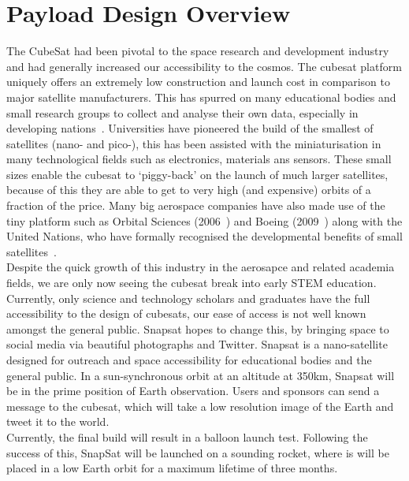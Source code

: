 \section{Payload Design Overview}
The CubeSat had been pivotal to the space research and development industry and had generally increased our accessibility to the cosmos. The cubesat platform uniquely offers an extremely low construction and launch cost in comparison to major satellite manufacturers. This has spurred on many educational bodies and small research groups to collect and analyse their own data, especially in developing nations~\cite{woeller}. Universities have pioneered the build of the smallest of satellites (nano- and pico-), this has been assisted with the miniaturisation in many technological fields such as electronics, materials ans sensors. These small sizes enable the cubesat to `piggy-back' on the launch of much larger satellites, because of this they are able to get to very high (and expensive) orbits of a fraction of the price. Many big aerospace companies have also made use of the tiny platform such as Orbital Sciences (2006~\cite{heidt}) and Boeing (2009~\cite{straub}) along with the United Nations, who have formally recognised the developmental benefits of small satellites~\cite{rycroft}. \\

\noindent
Despite the quick growth of this industry in the aerosapce and related academia fields, we are only now seeing the cubesat break into early STEM education. Currently, only science and technology scholars and graduates have the full accessibility to the design of cubesats, our ease of access is not well known amongst the general public. Snapsat hopes to change this, by bringing space to social media via beautiful photographs and Twitter. Snapsat is a nano-satellite designed for outreach and space accessibility for educational bodies and the general public. In a sun-synchronous orbit at an altitude at 350km, Snapsat will be in the prime position of Earth observation. Users and sponsors can send a message to the cubesat, which will take a low resolution image of the Earth and tweet it to the world. \\

\noindent
Currently, the final build will result in a balloon launch test. Following the success of this, SnapSat will be launched on a sounding rocket, where is will be placed in a low Earth orbit for a maximum lifetime of three months.